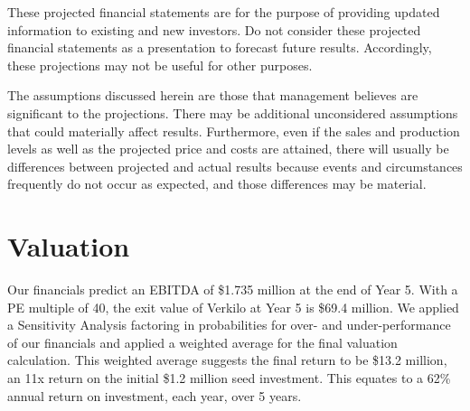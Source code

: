 \documentclass[10pt,openany]{book}
\begin{document}
These projected financial statements are for the purpose of providing
updated information to existing and new investors. Do not consider these
projected financial statements as a presentation to forecast future
results. Accordingly, these projections may not be useful for other
purposes.

The assumptions discussed herein are those that management believes are
significant to the projections. There may be additional unconsidered
assumptions that could materially affect results. Furthermore, even if
the sales and production levels as well as the projected price and costs
are attained, there will usually be differences between projected and
actual results because events and circumstances frequently do not occur
as expected, and those differences may be material.

\hypertarget{valuation}{%
\section{Valuation}\label{valuation}}

Our financials predict an EBITDA of \$1.735 million at the end of Year
5. With a PE multiple of 40, the exit value of Verkilo at Year 5 is
\$69.4 million. We applied a Sensitivity Analysis factoring in
probabilities for over- and under-performance of our financials and
applied a weighted average for the final valuation calculation. This
weighted average suggests the final return to be \$13.2 million, an 11x
return on the initial \$1.2 million seed investment. This equates to a
62\% annual return on investment, each year, over 5 years.
\end{document}
